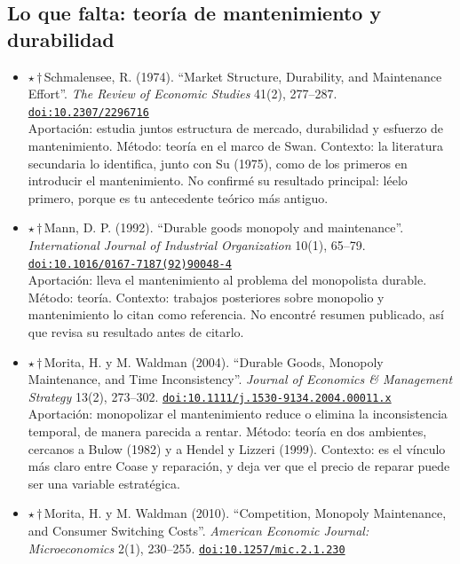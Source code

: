 \documentclass[11pt]{article}
\begin{document}
\subsection*{Lo que falta: teoría de mantenimiento y durabilidad}
\begin{itemize}
\item $\star$\,$\dagger$\,Schmalensee, R. (1974). ``Market Structure, Durability, and Maintenance Effort''. \textit{The Review of Economic Studies} 41(2), 277--287. \href{https://doi.org/10.2307/2296716}{\texttt{doi:10.2307/2296716}}\\
Aportación: estudia juntos estructura de mercado, durabilidad y esfuerzo de mantenimiento. Método: teoría en el marco de Swan. Contexto: la literatura secundaria lo identifica, junto con Su (1975), como de los primeros en introducir el mantenimiento. No confirmé su resultado principal: léelo primero, porque es tu antecedente teórico más antiguo.
\item $\star$\,$\dagger$\,Mann, D. P. (1992). ``Durable goods monopoly and maintenance''. \textit{International Journal of Industrial Organization} 10(1), 65--79. \href{https://doi.org/10.1016/0167-7187(92)90048-4}{\texttt{doi:10.1016/0167-7187(92)90048-4}}\\
Aportación: lleva el mantenimiento al problema del monopolista durable. Método: teoría. Contexto: trabajos posteriores sobre monopolio y mantenimiento lo citan como referencia. No encontré resumen publicado, así que revisa su resultado antes de citarlo.
\item $\star$\,$\dagger$\,Morita, H. y M. Waldman (2004). ``Durable Goods, Monopoly Maintenance, and Time Inconsistency''. \textit{Journal of Economics \& Management Strategy} 13(2), 273--302. \href{https://doi.org/10.1111/j.1530-9134.2004.00011.x}{\texttt{doi:10.1111/j.1530-9134.2004.00011.x}}\\
Aportación: monopolizar el mantenimiento reduce o elimina la inconsistencia temporal, de manera parecida a rentar. Método: teoría en dos ambientes, cercanos a Bulow (1982) y a Hendel y Lizzeri (1999). Contexto: es el vínculo más claro entre Coase y reparación, y deja ver que el precio de reparar puede ser una variable estratégica.
\item $\star$\,$\dagger$\,Morita, H. y M. Waldman (2010). ``Competition, Monopoly Maintenance, and Consumer Switching Costs''. \textit{American Economic Journal: Microeconomics} 2(1), 230--255. \href{https://doi.org/10.1257/mic.2.1.230}{\texttt{doi:10.1257/mic.2.1.230}}\\

\end{itemize}
\end{document}
